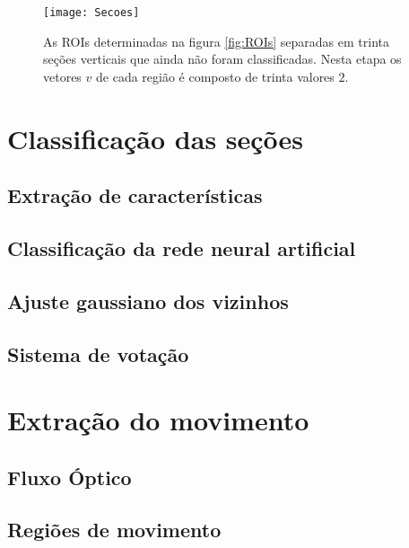 \begin{figure}
	\centering
	\texttt{[image: Secoes]}
	\label{fig:secoesVerticais}
	\caption{As ROIs determinadas na figura \ref{fig:ROIs} separadas em trinta seções verticais que ainda não foram classificadas. Nesta etapa os vetores $v$ de cada região é composto de trinta valores $2$.}
	\centering
\end{figure}


\section{Classificação das seções} \label{sec:classificacao}


\subsection{Extração de características}


\subsection{Classificação da rede neural artificial}

\subsection{Ajuste gaussiano dos vizinhos}

\subsection{Sistema de votação}


\section{Extração do movimento}

\subsection{Fluxo Óptico}

\subsection{Regiões de movimento}





